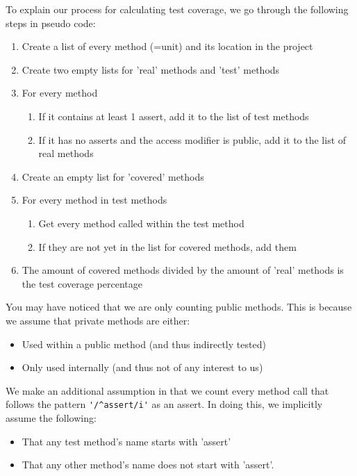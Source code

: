 \documentclass{article}
\begin{document}
To explain our process for calculating test coverage, we go through the following steps in pseudo code:

\begin{enumerate}
\item Create a list of every method (=unit) and its location in the project
\item Create two empty lists for 'real' methods and 'test' methods
\item For every method
	\begin{enumerate}
	\item If it contains at least 1 assert, add it to the list of test methods
	\item If it has no asserts and the access modifier is public, add it to the list of real methods
	\end{enumerate}
\item Create an empty list for 'covered' methods
\item For every method in test methods
	\begin{enumerate}
	\item Get every method called within the test method
	\item If they are not yet in the list for covered methods, add them
	\end{enumerate}
\item The amount of covered methods divided by the amount of 'real' methods is the test coverage percentage
\end{enumerate}

You may have noticed that we are only counting public methods. This is because we assume that private methods are either:

\begin{itemize}
\item Used within a public method (and thus indirectly tested)
\item Only used internally (and thus not of any interest to us)
\end{itemize}

We make an additional assumption in that we count every method call that follows the pattern \verb|'/^assert/i'| as an assert. In doing this, we implicitly assume the following:
\begin{itemize}
\item That any test method's name starts with 'assert'
\item That any other method's name does not start with 'assert'.
\end{itemize}
\end{document}
